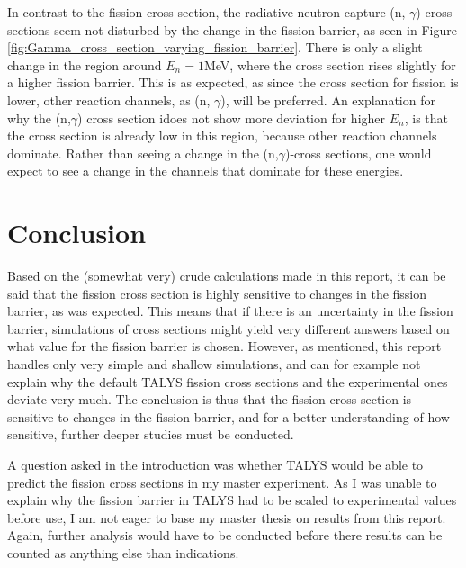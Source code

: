 \documentclass[]{article}
\begin{document}
 \par 
 \vspace{3mm}
 \noindent In contrast to the fission cross section, the radiative neutron capture (n, $\gamma$)-cross sections seem not disturbed by the change in the fission barrier, as seen in Figure \ref{fig:Gamma_cross_section_varying_fission_barrier}. There is only a slight change in the region around $E_n = 1$MeV, where the cross section rises slightly for a higher fission barrier. This is as expected, as since the cross section for fission is lower, other reaction channels, as (n, $\gamma$), will be preferred. An explanation for why the (n,$\gamma$) cross section idoes not show more deviation for higher $E_n$, is that the cross section is already low in this region, because other reaction channels dominate. Rather than seeing a change in the (n,$\gamma$)-cross sections, one would expect to see a change in the channels that dominate for these energies. 


\section{Conclusion}
Based on the (somewhat very) crude calculations made in this report, it can be said that the fission cross section is highly sensitive to changes in the fission barrier, as was expected. This means that if there is an uncertainty in the fission barrier, simulations of cross sections might yield very different answers based on what value for the fission barrier is chosen. However, as mentioned, this report handles only very simple and shallow simulations, and can for example not explain why the default TALYS fission cross sections and the experimental ones deviate very much. The conclusion is thus that the fission cross section is sensitive to changes in the fission barrier, and for a better understanding of how sensitive, further deeper studies must be conducted. 

\noindent A question asked in the introduction was whether TALYS would be able to predict the fission cross sections in my master experiment. As I was unable to explain why the fission barrier in TALYS had to be scaled to experimental values before use, I am not eager to base my master thesis on results from this report. Again, further analysis would have to be conducted before there results can be counted as anything else than indications. 



 
\end{document}

